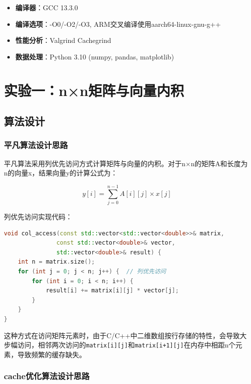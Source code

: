 \documentclass[a4paper,colorlinks=true,linkcolor=blue,urlcolor=blue,citecolor=green,bookmarks=true]{article}
\begin{document}
\begin{itemize}
  \item \textbf{编译器}：GCC 13.3.0
  \item \textbf{编译选项}：-O0/-O2/-O3, ARM交叉编译使用aarch64-linux-gnu-g++
  \item \textbf{性能分析}：Valgrind Cachegrind
  \item \textbf{数据处理}：Python 3.10 (numpy, pandas, matplotlib)
\end{itemize}

\section{实验一：n×n矩阵与向量内积}

\subsection{算法设计}

\subsubsection{平凡算法设计思路}

平凡算法采用列优先访问方式计算矩阵与向量的内积。对于n×n的矩阵A和长度为n的向量x，结果向量y的计算公式为：

\begin{equation}
  y[i] = \sum_{j=0}^{n-1} A[i][j] \times x[j]
\end{equation}

列优先访问实现代码：

\begin{lstlisting}[language=C++]
void col_access(const std::vector<std::vector<double>>& matrix, 
               const std::vector<double>& vector,
               std::vector<double>& result) {
    int n = matrix.size();
    for (int j = 0; j < n; j++) {  // 列优先访问
        for (int i = 0; i < n; i++) {
            result[i] += matrix[i][j] * vector[j];
        }
    }
}
\end{lstlisting}

这种方式在访问矩阵元素时，由于C/C++中二维数组按行存储的特性，会导致大步幅访问，相邻两次访问的\verb|matrix[i][j]|和\verb|matrix[i+1][j]|在内存中相距n个元素，导致频繁的缓存缺失。

\subsubsection{cache优化算法设计思路}
\end{document}
